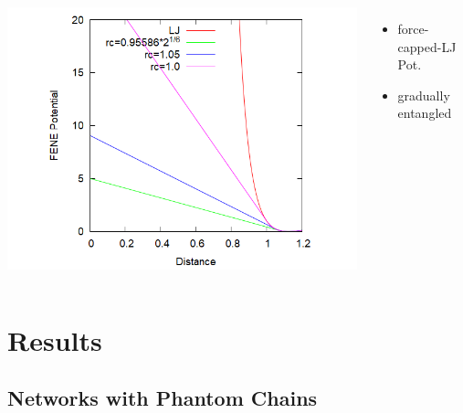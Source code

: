 \documentclass[12pt, dvipdfmx]{beamer}
\begin{document}
\begin{frame}
\begin{columns}[T, onlytextwidth]
\begin{center}
					\includegraphics[width=1.2\textwidth]{Ev_fcLJ.png}
				\end{center}
				\vspace{-3mm}
				\scriptsize
				\begin{itemize}
					\item force-capped-LJ Pot.
					\item gradually entangled
				\end{itemize}
		\end{columns}

\end{frame}

\section{Results}
\subsection{Networks with Phantom Chains}
\end{document}
